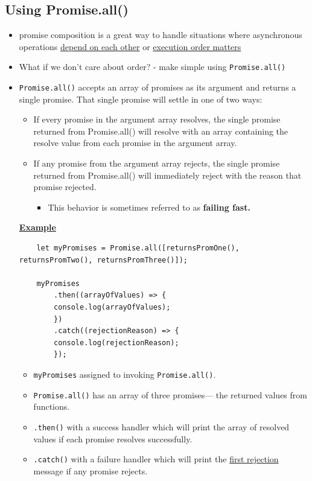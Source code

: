 \documentclass[12pt]{article}
\begin{document}
\subsection{Using Promise.all()}

\begin{itemize}
    \item promise composition is a great way to handle situations where asynchronous
    operations \ul{depend on each other} or \ul{execution order matters}
    \item What if we don't care about order? - make simple using \texttt{Promise.all()}
    \item \texttt{Promise.all()} accepts an array of promises as its argument and returns a single promise. That single promise will settle in one of two ways:
    \begin{itemize}
        \item If every promise in the argument array resolves, the single promise returned from Promise.all() will resolve with an array containing the resolve value from each promise in the argument array.
        \item If any promise from the argument array rejects, the single promise returned from Promise.all() will immediately reject with the reason that promise rejected.
        \begin{itemize}
            \item This behavior is sometimes referred to as \textbf{failing fast.}
        \end{itemize}
    \end{itemize}

    \underline{\textbf{Example}}

    \begin{lstlisting}
    let myPromises = Promise.all([returnsPromOne(), returnsPromTwo(), returnsPromThree()]);

    myPromises
        .then((arrayOfValues) => {
        console.log(arrayOfValues);
        })
        .catch((rejectionReason) => {
        console.log(rejectionReason);
        });
    \end{lstlisting}

    \begin{itemize}
        \item \texttt{myPromises} assigned to invoking \texttt{Promise.all()}.
        \item \texttt{Promise.all()} has an array of three promises— the returned values from functions.
        \item \texttt{.then()} with a success handler which will print the array of resolved values if each promise resolves successfully.
        \item \texttt{.catch()} with a failure handler which will print the \ul{first rejection} message if any promise rejects.


\end{itemize}
\end{itemize}
\end{document}
